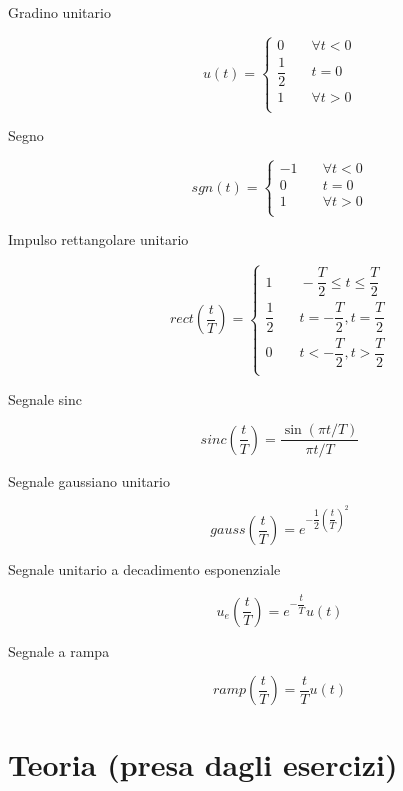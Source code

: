 \documentclass[10pt,a4paper]{article}
\begin{document}
\begin{multicols}{2}
\begin{description}
\item[Gradino unitario]
\[
u(t)= 
\left\lbrace
\begin{array}{ll}
0 & \quad \forall t < 0 \\
\dfrac{1}{2} & \quad t = 0 \\
1 & \quad \forall t > 0 \\
\end{array}
\right.
\]

\item[Segno]
\[
sgn(t)= 
\left\lbrace
\begin{array}{ll}
-1 & \quad \forall t < 0 \\
0 & \quad t = 0 \\
1 & \quad \forall t > 0 \\
\end{array}
\right.
\]

\item[Impulso rettangolare unitario]
\[
rect \left( \dfrac{t}{T} \right)= 
\left\lbrace
\begin{array}{ll}
1 & \quad -\dfrac{T}{2} \leq t \leq \dfrac{T}{2} \\
\dfrac{1}{2} & \quad t = -\dfrac{T}{2},t = \dfrac{T}{2} \\
0 & \quad t < -\dfrac{T}{2}, t > \dfrac{T}{2} \\
\end{array}
\right.
\]

\item[Segnale sinc]
\[
sinc \left( \dfrac{t}{T} \right) = \dfrac{\sin(\pi t/T)}{\pi t/T}
\]
\columnbreak
\item[Segnale gaussiano unitario]
\[
gauss \left( \dfrac{t}{T} \right) = e^{{-\dfrac{1}{2}}{\left( \dfrac{t}{T} \right)}^2}
\]

\item[Segnale unitario a decadimento esponenziale]
\[
u_e \left( \dfrac{t}{T} \right) = e^{-\dfrac{t}{T}}u(t)
\]

\item[Segnale a rampa]
\[
ramp \left( \dfrac{t}{T} \right) = \dfrac{t}{T} u(t)
\]

\end{description}
\end{multicols}

\section{Teoria (presa dagli esercizi)}
\end{document}
